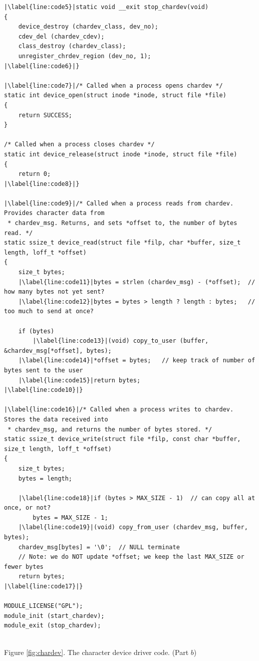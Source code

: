 \documentclass[epsfig,10pt,fullpage]{article}
\begin{document}
\lstset{language=C,numbers=left,escapechar=|,firstnumber=auto,name=chardev}
\begin{center}
\begin{minipage}[t]{15 cm}
\begin{lstlisting}[name=chardev]
|\label{line:code5}|static void __exit stop_chardev(void)
{
	device_destroy (chardev_class, dev_no);
	cdev_del (chardev_cdev);
	class_destroy (chardev_class);
	unregister_chrdev_region (dev_no, 1);
|\label{line:code6}|}

|\label{line:code7}|/* Called when a process opens chardev */
static int device_open(struct inode *inode, struct file *file)
{
	return SUCCESS;
}

/* Called when a process closes chardev */
static int device_release(struct inode *inode, struct file *file)
{
	return 0;
|\label{line:code8}|}

|\label{line:code9}|/* Called when a process reads from chardev. Provides character data from 
 * chardev_msg. Returns, and sets *offset to, the number of bytes read. */
static ssize_t device_read(struct file *filp, char *buffer, size_t length, loff_t *offset)
{
	size_t bytes;
	|\label{line:code11}|bytes = strlen (chardev_msg) - (*offset);	// how many bytes not yet sent?
	|\label{line:code12}|bytes = bytes > length ? length : bytes;	// too much to send at once?
	
	if (bytes)
		|\label{line:code13}|(void) copy_to_user (buffer, &chardev_msg[*offset], bytes);
	|\label{line:code14}|*offset = bytes;	// keep track of number of bytes sent to the user
	|\label{line:code15}|return bytes;
|\label{line:code10}|}

|\label{line:code16}|/* Called when a process writes to chardev. Stores the data received into
 * chardev_msg, and returns the number of bytes stored. */
static ssize_t device_write(struct file *filp, const char *buffer, size_t length, loff_t *offset)
{
	size_t bytes;
	bytes = length;

	|\label{line:code18}|if (bytes > MAX_SIZE - 1)	// can copy all at once, or not?
		bytes = MAX_SIZE - 1;
	|\label{line:code19}|(void) copy_from_user (chardev_msg, buffer, bytes);
	chardev_msg[bytes] = '\0';	// NULL terminate
	// Note: we do NOT update *offset; we keep the last MAX_SIZE or fewer bytes
	return bytes;
|\label{line:code17}|}

MODULE_LICENSE("GPL");
module_init (start_chardev);
module_exit (stop_chardev);
\end{lstlisting}
\end{minipage}
\end{center}
\begin{center}
~\\
Figure \ref{fig:chardev}. The character device driver code. (Part $b$)
\end{center}
\end{document}
